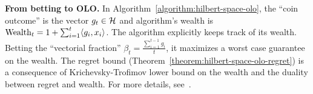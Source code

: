 \textbf{From betting to \ac{OLO}.}
In Algorithm~\ref{algorithm:hilbert-space-olo}, the ``coin outcome'' is the
vector $g_t \in \mathcal{H}$ and algorithm's wealth is $\operatorname{Wealth}_t = 1 + \sum_{i=1}^t
\langle g_i, x_i \rangle$.  The algorithm explicitly keeps track of its wealth.
Betting the ``vectorial fraction'' $\beta_t = \tfrac{\sum_{i=1}^{t-1} g_i}{t}$,
it maximizes a worst case guarantee on the wealth. The regret bound
(Theorem~\ref{theorem:hilbert-space-olo-regret}) is a consequence of
Krichevsky-Trofimov lower bound on the wealth and the duality between regret
and wealth.  For more details, see~\cite{Orabona-Pal-2016-parameter-free}.
